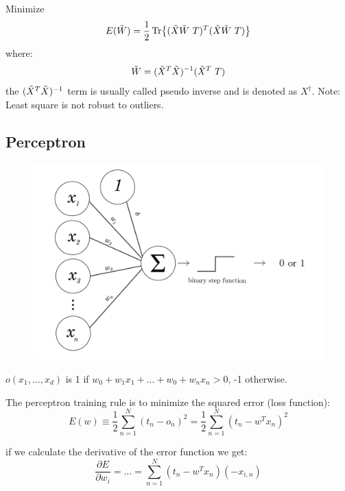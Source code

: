 Minimize
\begin{equation}
    E(\Tilde{W}) = \frac{1}{2} \Tr{(\Tilde{X}\Tilde{W}\ T)^{T} ( \Tilde{X}\Tilde{W}\ T)}
\end{equation}
where:
\begin{equation}
    \Tilde{W} = (\Tilde{X}^T\Tilde{X})^{-1}(\Tilde{X}^{T}\ T)
\end{equation}
the $(\Tilde{X}^T\Tilde{X})^{-1}$ term is usually called pseudo inverse and is denoted as $X^{\dagger}$. Note: Least square is not robust to outliers.

\subsection{Perceptron}

\begin{figure}[H]
    \centering
    \includegraphics[width=15cm]{images/Probabilistic Models/perceptron.png}
    \caption{}
    \label{fig:perceptron}
\end{figure}

$o(x_{1}, \dots, x_{d})$ is 1 if $w_{0} + w_{1}x_{1} + \dots +w_{0} + w_{n}x_{n} > 0$, -1 otherwise.

The perceptron training rule is to minimize the squared error (loss function):
\begin{equation}
    E(w) \equiv \frac{1}{2}\sum_{n=1}^{N}(t_{n} - o_{n})^{2} = \frac{1}{2} \sum_{n=1}^{N}
(t_{n} - w^{T}x_{n})^2\end{equation}

if we calculate the derivative of the error function we get:
\begin{equation}
    \frac{\partial E}{\partial w_{i}} = \dots = \sum_{n=1}^{N}(t_{n} - w^{T}x_{n})(-x_{i,n})
\end{equation}

